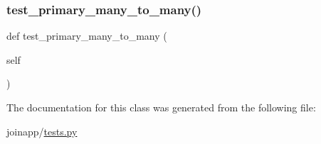 \subsubsection{\texorpdfstring{test\_primary\_many\_to\_many()}{test\_primary\_many\_to\_many()}}
{\footnotesize\ttfamily def test\+\_\+primary\+\_\+many\+\_\+to\+\_\+many (\begin{DoxyParamCaption}\item[{}]{self }\end{DoxyParamCaption})}



The documentation for this class was generated from the following file\+:\begin{DoxyCompactItemize}
\item 
joinapp/\mbox{\hyperlink{tests_8py}{tests.\+py}}\end{DoxyCompactItemize}
